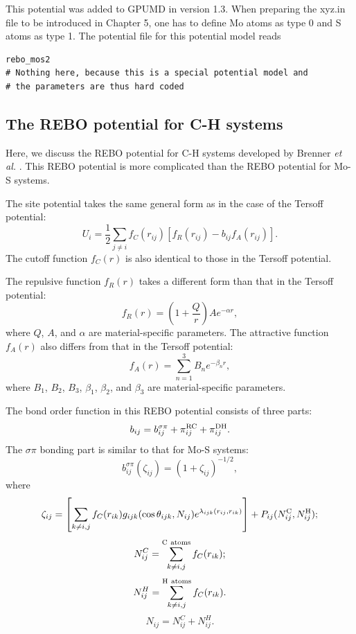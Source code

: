 \documentclass[12pt,a4paper]{report}
\begin{document}
This potential was added to GPUMD in version 1.3. When preparing the xyz.in file to be introduced in Chapter 5, one has to define Mo atoms as type 0 and S atoms as type 1. The potential file for this potential model reads
\begin{verbatim}
rebo_mos2
# Nothing here, because this is a special potential model and 
# the parameters are thus hard coded
\end{verbatim}


\subsection{The REBO potential for C-H systems}

Here, we discuss the REBO potential for C-H systems developed by Brenner \textit{et al.} \cite{brenner2002jpcm}. This REBO potential is more complicated than the REBO potential for Mo-S systems.

The site potential takes the same general form as in the case of the Tersoff potential:
\begin{equation}
U_i =  \frac{1}{2} \sum_{j \neq i} f_C(r_{ij}) \left[ f_R(r_{ij}) - b_{ij} f_A(r_{ij}) \right].
\end{equation}
The cutoff function $f_{C}(r)$ is also identical to those in the Tersoff potential. 

The repulsive function $f_{R}(r)$ takes a different form than that in the Tersoff potential:
\begin{equation}
f_{R}(r) = \left(1+\frac{Q}{r}\right) A e^{-\alpha r},
\end{equation}
where $Q$, $A$, and $\alpha$ are material-specific parameters. The attractive function $f_{A}(r)$ also differs from that in the Tersoff potential:
\begin{equation}
f_{A}(r) = \sum_{n=1}^3 B_n e^{-\beta_n r},
\end{equation}
where $B_1$, $B_2$, $B_3$, $\beta_1$, $\beta_2$, and $\beta_3$ are material-specific parameters.

The bond order function in this REBO potential consists of three parts:
\begin{equation}
b_{ij} =b_{ij}^{\sigma\pi} + \pi_{ij}^{\rm RC} + \pi_{ij}^{\rm DH}.
\end{equation}
The $\sigma\pi$ bonding part is similar to that for Mo-S systems:
\begin{equation}
b_{ij}^{\sigma\pi}(\zeta_{ij}) =\left(1 + \zeta_{ij}\right)^{-1/2},
\end{equation}
where
\begin{equation}
\zeta_{ij} = \left[ \sum_{k\neq i, j} f_C(r_{ik}) g_{ijk}(\cos\theta_{ijk}, N_{ij})e^{\lambda_{ijk}(r_{ij},r_{ik})} \right] + P_{ij}(N_{ij}^{\rm C}, N_{ij}^{\rm H});
\end{equation}
\begin{equation}
N_{ij}^{C} = \sum_{k\neq i,j}^{\rm{C~atoms}} f_C(r_{ik});
\end{equation}
\begin{equation}
N_{ij}^{H} = \sum_{k\neq i,j}^{\rm{H~atoms}} f_C(r_{ik}).
\end{equation}
\begin{equation}
N_{ij} =N_{ij}^{C}+N_{ij}^{H}.
\end{equation}
\end{document}
